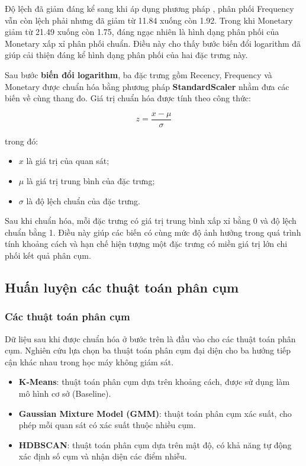 \documentclass[12pt]{ai_conquer2026}
\begin{document}
Độ lệch đã giảm đáng kể sang khi áp dụng phương pháp , phân phối Frequency vẫn còn lệch phải nhưng đã giảm từ 11.84 xuống còn 1.92. Trong khi Monetary giảm từ 21.49 xuống còn 1.75, đáng ngạc nhiên là hình dạng phân phối của Monetary xấp xỉ phân phối chuẩn. Điều này cho thấy bước biến đổi logarithm đã giúp cải thiện đáng kể hình dạng phân phối của hai đặc trưng này.

Sau bước \textbf{biến đổi logarithm}, ba đặc trưng gồm Recency, Frequency và Monetary được chuẩn hóa bằng phương pháp \textbf{StandardScaler} nhằm đưa các biến về cùng thang đo. Giá trị chuẩn hóa được tính theo công thức:

\begin{equation}
z=\frac{x-\mu}{\sigma}
\end{equation}

trong đó:

\begin{itemize}
    \item $x$ là giá trị của quan sát;
    \item $\mu$ là giá trị trung bình của đặc trưng;
    \item $\sigma$ là độ lệch chuẩn của đặc trưng.
\end{itemize}

Sau khi chuẩn hóa, mỗi đặc trưng có giá trị trung bình xấp xỉ bằng 0 và độ lệch chuẩn bằng 1. Điều này giúp các biến có cùng mức độ ảnh hưởng trong quá trình tính khoảng cách và hạn chế hiện tượng một đặc trưng có miền giá trị lớn chi phối kết quả phân cụm.

\subsection{Huấn luyện các thuật toán phân cụm}

\subsubsection{Các thuật toán phân cụm}

Dữ liệu sau khi được chuẩn hóa ở bước trên là đầu vào cho các thuật toán phân cụm. Nghiên cứu lựa chọn ba thuật toán phân cụm đại diện cho ba hướng tiếp cận khác nhau trong học máy không giám sát.

\begin{itemize}

\item \textbf{K-Means}: thuật toán phân cụm dựa trên khoảng cách, được sử dụng làm mô hình cơ sở (Baseline).

\item \textbf{Gaussian Mixture Model (GMM)}: thuật toán phân cụm xác suất, cho phép mỗi quan sát có xác suất thuộc nhiều cụm.

\item \textbf{HDBSCAN}: thuật toán phân cụm dựa trên mật độ, có khả năng tự động xác định số cụm và nhận diện các điểm nhiễu.

\end{itemize}
\end{document}
